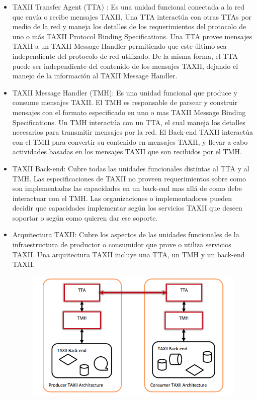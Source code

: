 \begin{itemize}
  \item TAXII Transfer Agent (TTA) : Es una unidad funcional conectada a la red 
  que envía o recibe mensajes TAXII. Una TTA interactúa con otras TTAs por medio 
  de la red y maneja los detalles de los requerimientos del protocolo de uno o 
  más TAXII Protocol Binding Specifications. Una TTA provee mensajes TAXII a un 
  TAXII Message Handler permitiendo que este último sea independiente del 
  protocolo de red utilizado. De la misma forma, el TTA puede ser independiente 
  del contenido de los mensajes TAXII, dejando el manejo de la información al 
  TAXII Message Handler.
  \item TAXII Message Handler (TMH): Es una unidad funcional que produce y 
  consume mensajes TAXII. El TMH es responsable de parsear y construir mensajes 
  con el formato especificado en uno o mas TAXII Message Binding Specifications. 
  Un TMH interactúa con un TTA, el cual maneja los detalles necesarios para 
  transmitir mensajes por la red. El Back-end TAXII interactúa con el TMH para 
  convertir su contenido en mensajes TAXII, y llevar a cabo actividades basadas 
  en los mensajes TAXII que son recibidos por el TMH.
  \item TAXII Back-end: Cubre todas las unidades funcionales distintas al TTA y 
  al TMH. Las especificaciones de TAXII no proveen requerimientos sobre como son 
  implementadas las capacidades en un back-end mas allá de como debe interactuar 
  con el TMH. Las organizaciones o implementadores pueden decidir que 
  capacidades implementar según los servicios TAXII que deseen soportar o según 
  como quieren dar ese soporte.
  \item Arquitectura TAXII: Cubre los aspectos de las unidades funcionales de la 
  infraestructura de productor o consumidor que prove o utiliza servicios TAXII. 
  Una arquitectura TAXII incluye una TTA, un TMH y un back-end TAXII.
  
  
\begin{figure}[ht!]
  \centering
    \includegraphics[width=150mm]{./Figures/TAXIIArchitecture.png}
\end{figure}
  
\end{itemize}

